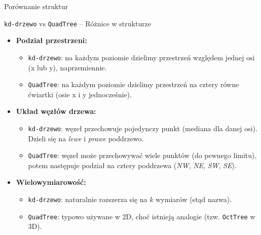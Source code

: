\documentclass[aspectratio=1610, polish]{beamer}
\begin{document}
\begin{section}{Porównanie struktur}

\begin{frame}{\texttt{kd-drzewo} vs \texttt{QuadTree} -- Różnice w strukturze}
    \begin{itemize}
        \item \textbf{Podział przestrzeni:}
            \begin{itemize}
                \item \texttt{kd-drzewo}: na każdym poziomie dzielimy przestrzeń względem jednej osi (x lub y), naprzemiennie.
                \item \texttt{QuadTree}: na każdym poziomie dzielimy przestrzeń na cztery równe ćwiartki (osie x i y jednocześnie).
            \end{itemize}
            \vspace{0.4em}
            
        \item \textbf{Układ węzłów drzewa:}
            \begin{itemize}
                \item \texttt{kd-drzewo}: węzeł przechowuje pojedynczy punkt (mediana dla danej osi). Dzieli się na \emph{lewe} i \emph{prawe} poddrzewo.
                \item \texttt{QuadTree}: węzeł może przechowywać wiele punktów (do pewnego limitu), potem następuje podział na cztery poddrzewa (\emph{NW}, \emph{NE}, \emph{SW}, \emph{SE}).
            \end{itemize}
            \vspace{0.4em}
            
        \item \textbf{Wielowymiarowość:}
            \begin{itemize}
                \item \texttt{kd-drzewo}: naturalnie rozszerza się na \(k\) wymiarów (stąd nazwa).
                \item \texttt{QuadTree}: typowo używane w 2D, choć istnieją analogie (tzw. \texttt{OctTree} w 3D).
            \end{itemize}
    \end{itemize}
\end{frame}


\end{section}
\end{document}
